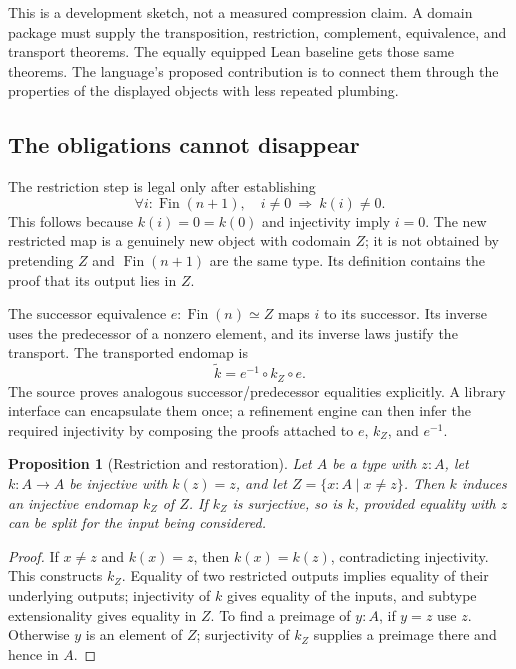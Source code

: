 \documentclass[11pt,letterpaper]{article}
\newtheorem{proposition}[definition]{Proposition}
\theoremstyle{remark}
\begin{document}
This is a development sketch, not a measured compression claim. A domain
package must supply the transposition, restriction, complement, equivalence,
and transport theorems. The equally equipped Lean baseline gets those same
theorems. The language's proposed contribution is to connect them through the
properties of the displayed objects with less repeated plumbing.

\subsection{The obligations cannot disappear}
The restriction step is legal only after establishing
\[
 \forall i:\operatorname{Fin}(n+1),\quad
     i\ne0\ \Longrightarrow\ k(i)\ne0.
\]
This follows because $k(i)=0=k(0)$ and injectivity imply $i=0$.
The new restricted map is a genuinely new object with codomain $Z$; it is not
obtained by pretending $Z$ and $\operatorname{Fin}(n+1)$ are the same type.
Its definition contains the proof that its output lies in $Z$.

The successor equivalence $e:\operatorname{Fin}(n)\simeq Z$ maps $i$ to its
successor. Its inverse uses the predecessor of a nonzero element, and its
inverse laws justify the transport. The transported endomap is
\[
  \widetilde k=e^{-1}\circ k_Z\circ e.
\]
The source proves analogous successor/predecessor equalities explicitly.
A library interface can encapsulate them once; a refinement engine can then
infer the required injectivity by composing the proofs attached to $e$,
$k_Z$, and $e^{-1}$.

\begin{proposition}[Restriction and restoration]\label{prop:restriction}
Let $A$ be a type with $z:A$, let $k:A\to A$ be injective with $k(z)=z$, and
let $Z=\{x:A\mid x\ne z\}$. Then $k$ induces an injective endomap $k_Z$ of
$Z$. If $k_Z$ is surjective, so is $k$, provided equality with $z$ can be
split for the input being considered.
\end{proposition}
\begin{proof}
If $x\ne z$ and $k(x)=z$, then $k(x)=k(z)$, contradicting injectivity.
This constructs $k_Z$. Equality of two restricted outputs implies equality
of their underlying outputs; injectivity of $k$ gives equality of the inputs,
and subtype extensionality gives equality in $Z$.
To find a preimage of $y:A$, if $y=z$ use $z$. Otherwise $y$ is an element of
$Z$; surjectivity of $k_Z$ supplies a preimage there and hence in $A$.
\end{proof}
\end{document}
